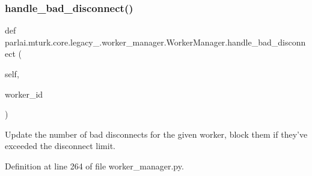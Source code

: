 \subsubsection{\texorpdfstring{handle\+\_\+bad\+\_\+disconnect()}{handle\_bad\_disconnect()}}
{\footnotesize\ttfamily def parlai.\+mturk.\+core.\+legacy\+\_.\+worker\+\_\+manager.\+Worker\+Manager.\+handle\+\_\+bad\+\_\+disconnect (\begin{DoxyParamCaption}\item[{}]{self,  }\item[{}]{worker\+\_\+id }\end{DoxyParamCaption})}

\begin{DoxyVerb}Update the number of bad disconnects for the given worker, block them if they've
exceeded the disconnect limit.
\end{DoxyVerb}
 

Definition at line 264 of file worker\+\_\+manager.\+py.


